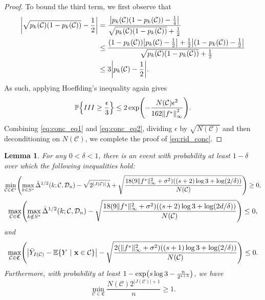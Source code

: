 \documentclass[11pt]{article}
\newtheorem{lemma}[theorem]{Lemma}
\newcommand{\bx}{\mathbf{x}}
\DeclarePairedDelimiter{\braces}{\lbrace}{\rbrace}
\DeclarePairedDelimiter{\paren}{(}{)}
\DeclarePairedDelimiter{\abs}{|}{|}
\DeclarePairedDelimiter{\norm}{\|}{\|}
\renewcommand{\P}{\mathbb{P}}
\newcommand{\E}{\mathbb{E}}
\newcommand{\cell}{\mathcal{C}}
\newcommand{\sparsity}{s}
\newcommand{\nfeats}{d}
\newcommand{\nsamples}{n}
\newcommand{\data}[1][n]{\mathcal{D}_{#1}}
\newcommand{\cellfeatindices}{J}
\newcommand{\suppset}{S^*}
\newcommand{\cellsampindices}{I}
\newcommand{\ridhat}{\hat\Delta^{1/2}}
\newcommand{\cellcollection}{{\mathfrak{C}^*}}
\newcommand{\secondcellcollection}{\mathfrak{C}}
\begin{document}
\begin{proof}
    To bound the third term, we first observe that
    \begin{equation} \nonumber
        \begin{split}
            \abs*{\sqrt{p_k(\cell)(1-p_k(\cell))} - \frac{1}{2}} & = \frac{\abs*{p_k(\cell)(1-p_k(\cell)) - \frac{1}{4}}}{\sqrt{p_k(\cell)(1-p_k(\cell))} + \frac{1}{2}} \\
            & \leq \frac{(1-p_k(\cell))\abs*{p_k(\cell) - \frac{1}{2}} + \frac{1}{2}\abs*{(1-p_k(\cell)) - \frac{1}{2}}}{\sqrt{p_k(\cell)(1-p_k(\cell))} + \frac{1}{2}} \\
            & \leq 3 \abs*{p_k(\cell) - \frac{1}{2}}.
        \end{split}
    \end{equation}
    As such, applying Hoeffding's inequality again gives
    \begin{equation} \label{eq:conc_eq2}
        \P\braces*{III \geq \frac{\epsilon}{3}} \leq 2\exp\paren*{-\frac{N(\cell)\epsilon^2}{162\norm*{f^*}_\infty^2}}.
    \end{equation}
    Combining \eqref{eq:conc_eq1} and \eqref{eq:conc_eq2}, dividing $\epsilon$ by $\sqrt{N(\cell)}$ and then deconditioning on $N(\cell)$, we complete the proof of \eqref{eq:rid_conc}.
\end{proof}

\begin{lemma}
    \label{lem:CART_invariants}
    For any $0 < \delta < 1$, there is an event with probability at least $1-\delta$ over which the following inequalities hold:
    \begin{equation}
        \label{eq:relevant_rid_lower_bound}
        \min_{\cell \in \cellcollection} \paren*{\max_{k \in \suppset} \ridhat(k;\cell,\data) - \sqrt{2^{|\cellfeatindices(\cell)|}\lambda} + \sqrt{\frac{18(9\norm{f^*}_\infty^2 + \sigma^2)\paren*{(s+2)\log 3 + \log(2/\delta)}}{N(\cell)}}} \geq 0,
    \end{equation}
    \begin{equation}
        \label{eq:irrelevant_rid_upper_bound}
        \max_{\cell \in \secondcellcollection} \paren*{\max_{k \notin \suppset} \ridhat(k;\cell,\data) - \sqrt{\frac{18(9\norm{f^*}_\infty^2 + \sigma^2)\paren*{(s+2)\log 3 + \log(2\nfeats/\delta)}}{N(\cell)}}} \leq 0,
    \end{equation}
    and
    \begin{equation}
        \label{eq:cell_mean_uniform}
        \max_{\cell \in \secondcellcollection} \paren*{\abs*{\bar Y_{\cellsampindices(\cell)} - \E\braces*{Y~|~\bx \in \cell}} - \sqrt{\frac{2(\norm{f^*}_\infty^2 + \sigma^2)\paren*{(s+1)\log 3 +\log(2/\delta)}}{N(\cell)}}} \leq 0.
    \end{equation}
    Furthermore, with probability at least $1-\exp\paren*{\sparsity\log3 - \frac{\nsamples}{2^{\sparsity+3}}}$, we have
    \begin{equation} 
        \label{eq:cell_count_uniform}
        \min_{\cell \in \secondcellcollection} \frac{N(\cell)2^{|\cellfeatindices(\cell)|+1}}{\nsamples} \geq 1.
    \end{equation}
\end{lemma}
\end{document}
